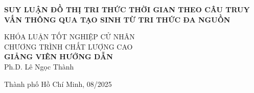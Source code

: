 \begin{titlepage}
\begin{center}

{ \Large \bfseries SUY LUẬN ĐỒ THỊ TRI THỨC THỜI
GIAN THEO CÂU TRUY VẤN THÔNG QUA TẠO SINH TỪ TRI THỨC ĐA
NGUỒN \\[2cm] } 


\normalsize KHÓA LUẬN TỐT NGHIỆP CỬ NHÂN\\
\normalsize CHƯƠNG TRÌNH CHẤT LƯỢNG CAO\\[2cm]

\textbf{GIẢNG VIÊN HƯỚNG DẪN}\\
Ph.D. Lê Ngọc Thành\\


\vfill
Thành phố Hồ Chí Minh, 08/2025

\end{center}
\end{titlepage}
